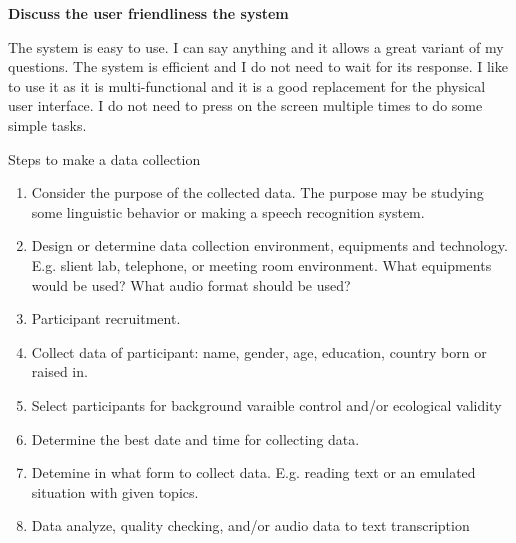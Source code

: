 \documentclass[12pt]{article}
\newenvironment{problem}[2][Problem]{\begin{trivlist}
\item[\hskip \labelsep {\bfseries #1}\hskip \labelsep {\bfseries #2.}]}{\end{trivlist}}
\begin{document}
\begin{problem}{3.3}
    \textbf{Discuss the user friendliness the system}

    The system is easy to use. 
    I can say anything and it allows a great variant of my questions. 
    The system is efficient and I do not need to wait for its response. 
    I like to use it as it is multi-functional and it is a good replacement 
    for the physical user interface. 
    I do not need to press on the screen multiple times to do some simple tasks.

\end{problem}

\pagebreak
\begin{problem}{4.1}
    Steps to make a data collection
    \begin{enumerate}
        \item Consider the purpose of the collected data. The purpose may be
        studying some linguistic behavior or making a speech recognition system.
        \item Design or determine data collection environment, equipments and technology.
        E.g. slient lab, telephone, or meeting room environment.
        What equipments would be used? What audio format should be used?
        \item Participant recruitment.
        \item Collect data of participant: name, gender, age, education, country born or raised in.
        \item Select participants for background varaible control and/or ecological validity
        \item Determine the best date and time for collecting data.
        \item Detemine in what form to collect data.
        E.g. reading text or an emulated situation with given topics.
        \item Data analyze, quality checking, and/or audio data to text transcription
    \end{enumerate}
\end{problem}
\end{document}
